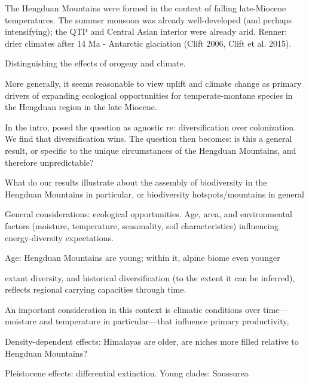 The Hengduan Mountains were formed in the context of falling late-Miocene temperatures. The summer monsoon was already well-developed (and perhaps intensifying); the QTP and Central Asian interior were already arid. Renner: drier climates after 14 Ma - Antarctic glaciation (Clift 2006, Clift et al. 2015).



Distinguishing the effects of orogeny and climate. 

More generally, it seems reasonable to view uplift and climate change as primary drivers of expanding ecological opportunities for temperate-montane species in the Hengduan region in the late Miocene.

In the intro, posed the question as agnostic re: diversification over colonization. We find that diversification wins. The question then becomes: is this a general result, or specific to the unique circumstances of the Hengduan Mountains, and therefore unpredictable?

What do our results illustrate about the assembly of biodiversity in the Hengduan Mountains in particular, or biodiversity hotspots/mountains in general

General considerations: ecological opportunities. Age, area, and environmental factors (moisture, temperature, seasonality, soil characteristics) influencing energy-diversity expectations.

Age: Hengduan Mountains are young; within it, alpine biome even younger



 extant diversity, and historical diversification (to the extent it can be inferred), reflects regional carrying capacities through time. 

An important consideration in this context is climatic conditions over time---moisture and temperature in particular---that influence primary productivity,  

Density-dependent effects: Himalayas are older, are niches more filled relative to Hengduan Mountains?

Pleistocene effects: differential extinction. Young clades: Saussurea


